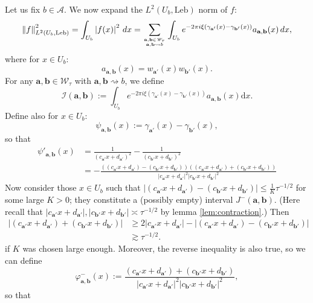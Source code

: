 \documentclass[12pt]{amsart}
\newcommand*\abs[1]{
	\left|#1\right|
}
\newcommand*\deriv{
	\mathrm{d}
}
\newcommand*\Leb{
	\mathrm{Leb}
}
\newcommand{\norm}[1]{\left\lVert#1\right\rVert}
\theoremstyle{definition}
\renewcommand{\leq}{\leqslant}
\renewcommand{\geq}{\geqslant}
\begin{document}
Let us fix $b \in \mathcal{A}$. We now expand the $L^2(U_b, \Leb)$ norm of $f$:
\[
\norm{f}_{L^2(U_b, \Leb)}^2
=
\int_{U_b}\abs{f(x)}^2\,dx
=
\sum_{\mathbf{a},\mathbf{b}\in\mathscr{W}_\tau\atop \mathbf{a},\mathbf{b}\rightsquigarrow b}
\int_{U_b} e^{-2\pi i\xi(\gamma_{\mathbf{a}'}(x)-\gamma_{\mathbf{b}'}(x))}
a_{\mathbf{a},\mathbf{b}}(x)\,dx,
\]
where for $x \in U_b$:
\[
a_{\mathbf{a},\mathbf{b}}(x) = w_{\mathbf{a}'}(x)w_{\mathbf{b}'}(x).
\]
For any $\mathbf{a},\mathbf{b}\in\mathscr{W}_\tau$ with $\mathbf{a}, \mathbf{b} \rightsquigarrow b$, we define
\[\mathcal{I}(\mathbf{a},\mathbf{b}) := \int_{U_b} e^{-2\pi i\xi(\gamma_{\mathbf{a}'}(x)-\gamma_{\mathbf{b}'}(x))}a_{\mathbf{a},\mathbf{b}}(x)\deriv x.\]
Define also for $x \in U_b$:
\[\psi_{\mathbf{a},\mathbf{b}}(x) := \gamma_{\mathbf{a}'}(x)-\gamma_{\mathbf{b}'}(x),\]
so that
\begin{align*}
\psi'_{\mathbf{a},\mathbf{b}}(x)
&= \frac{1}{(c_{\mathbf{a}'}x + d_{\mathbf{a}'})^2} - \frac{1}{(c_{\mathbf{b}'}x + d_{\mathbf{b}'})^2} \\
&= -\frac{\left((c_{\mathbf{a}'}x + d_{\mathbf{a}'}) - (c_{\mathbf{b}'}x + d_{\mathbf{b}'})\right)\left((c_{\mathbf{a}'}x + d_{\mathbf{a}'}) + (c_{\mathbf{b}'}x + d_{\mathbf{b}'})\right)}{\abs{c_{\mathbf{a}'}x + d_{\mathbf{a}'}}^2\abs{c_{\mathbf{b}'}x + d_{\mathbf{b}'}}^2}
\end{align*}
Now consider those $x \in U_b$ such that $\abs{(c_{\mathbf{a}'}x + d_{\mathbf{a}'}) - (c_{\mathbf{b}'}x + d_{\mathbf{b}'})} \leq \frac{1}{K}\tau^{-1/2}$ for some large $K > 0$; they constitute a (possibly empty) interval $J^{-}(\mathbf{a}, \mathbf{b})$. (Here recall that $\abs{c_{\mathbf{a}'}x + d_{\mathbf{a}'}}, \abs{c_{\mathbf{b}'}x + d_{\mathbf{b}'}} \asymp \tau^{-1/2}$ by lemma \ref{lem:contraction}.) Then
\begin{align*}
\abs{(c_{\mathbf{a}'}x + d_{\mathbf{a}'}) + (c_{\mathbf{b}'}x + d_{\mathbf{b}'})}
&\geq 2\abs{c_{\mathbf{a}'}x + d_{\mathbf{a}'}} - \abs{(c_{\mathbf{a}'}x + d_{\mathbf{a}'}) - (c_{\mathbf{b}'}x + d_{\mathbf{b}'})}\\
&\gtrsim \tau^{-1/2}.
\end{align*}
if $K$ was chosen large enough. Moreover, the reverse inequality is also true, so we can define
\[\varphi^{-}_{\mathbf{a},\mathbf{b}}(x) := \frac{(c_{\mathbf{a}'}x + d_{\mathbf{a}'}) + (c_{\mathbf{b}'}x + d_{\mathbf{b}'})}{\abs{c_{\mathbf{a}'}x + d_{\mathbf{a}'}}^2\abs{c_{\mathbf{b}'}x + d_{\mathbf{b}'}}^2},\] so that
\end{document}
